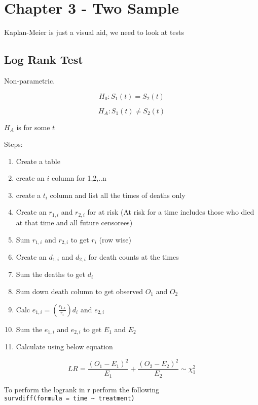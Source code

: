 \documentclass[
  letterpaper,
  DIV=11,
  numbers=noendperiod]{scrreprt}
\providecommand{\tightlist}{%
  \setlength{\itemsep}{0pt}\setlength{\parskip}{0pt}}\usepackage{longtable,booktabs,array}
\begin{document}
\hypertarget{chapter-3---two-sample}{%
\section{Chapter 3 - Two Sample}\label{chapter-3---two-sample}}

Kaplan-Meier is just a visual aid, we need to look at tests

\hypertarget{log-rank-test}{%
\subsection{Log Rank Test}\label{log-rank-test}}

Non-parametric.

\[ H_0 : S_1(t) = S_2(t)\]

\[ H_A : S_1(t) \neq S_2(t)\]

\(H_A\) is for some \(t\)

Steps:

\begin{enumerate}
\def\labelenumi{\arabic{enumi})}
\tightlist
\item
  Create a table
\item
  create an \(i\) column for 1,2,..n
\item
  create a \(t_i\) column and list all the times of deaths only
\item
  Create an \(r_{1,i}\) and \(r_{2,i}\) for at risk (At risk for a time
  includes those who died at that time and all future censorees)
\item
  Sum \(r_{1,i}\) and \(r_{2,i}\) to get \(r_i\) (row wise)
\item
  Create an \(d_{1,i}\) and \(d_{2,i}\) for death counts at the times
\item
  Sum the deaths to get \(d_i\)
\item
  Sum down death column to get observed \(O_1\) and \(O_2\)
\item
  Calc \(e_{1,i} = (\frac{r_{1,i}}{r_i})d_i\) and \(e_{2,i}\)
\item
  Sum the \(e_{1,i}\) and \(e_{2,i}\) to get \(E_1\) and \(E_2\)
\item
  Calculate using below equation
\end{enumerate}

\[ LR = \frac{(O_1 - E_1)^2}{E_1} + \frac{(O_2 - E_2)^2}{E_2} \sim \chi^2_{1}\]

To perform the logrank in r perform the following
\texttt{survdiff(formula\ =\ \textquotesingle{}time\ \textasciitilde{}\ treatment\textquotesingle{})}
\end{document}
